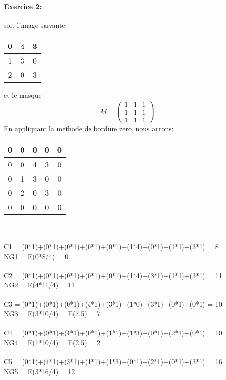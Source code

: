\documentclass{article}
\begin{document}
\paragraph{Exercice 2:\\}
soit l'image suivante:
\begin{tabular}{|c|c|c|}
\hline
0 & 4 & 3 \\
\hline
1 & 3 & 0 \\
\hline
2 & 0 & 3 \\
\hline 
\end{tabular} et le masque 
\begin{equation*}
M=
\begin{pmatrix}
1 & 1 & 1\\
1 & 1 & 1\\
1 & 1 & 1
\end{pmatrix}
\end{equation*}
En appliquant la methode de bordure zero, nous aurons: \begin{tabular}{|c|c|c|c|c|}
\hline
0 & 0 & 0 & 0 & 0 \\
\hline 
0 & 0 & 4 & 3 & 0 \\
\hline
0 & 1 & 3 & 0 & 0 \\
\hline
0 & 2 & 0 & 3 & 0 \\
\hline 
0 & 0 & 0 & 0 & 0 \\
\hline 
\end{tabular}\\ \\
 C1 = (0*1)+(0*1)+(0*1)+(0*1)+(0*1)+(1*4)+(0*1)+(1*1)+(3*1) = 8 \\
 NG1 = E(0*8/4) = 0 \\ \\
 C2 = (0*1)+(0*1)+(0*1)+(0*1)+(0*1)+(1*4)+(3*1)+(1*1)+(3*1) = 11\\
 NG2 = E(4*11/4) = 11 \\ \\
 C3 = (0*1)+(0*1)+(0*1)+(4*1)+(3*1)+(1*0)+(3*1)+(0*1)+(0*1) = 10 \\
 NG3 = E(3*10/4) = E(7.5) = 7 \\ \\
 C4 = (0*1)+(0*1)+(4*1)+(0*1)+(1*1)+(1*3)+(0*1)+(2*1)+(0*1) = 10 \\
 NG4 = E(1*10/4) = E(2.5) = 2\\ \\
 C5 = (0*1)+(4*1)+(3*1)+(1*1)+(1*3)+(0*1)+(2*1)+(0*1)+(3*1) = 16 \\
 NG5 = E(3*16/4) = 12 \\ \\
\end{document}
